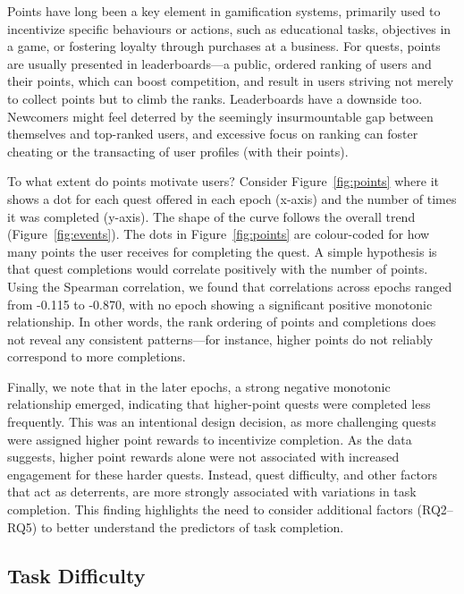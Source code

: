 Points have long been a key element in gamification systems, primarily used to incentivize specific behaviours or actions, such as educational tasks, objectives in a game, or fostering loyalty through purchases at a business. For quests, points are usually presented in leaderboards---a public, ordered ranking of users and their points, which can boost competition, and result in users striving not merely to collect points but to climb the ranks. Leaderboards have a downside too. Newcomers might feel deterred by the seemingly insurmountable gap between themselves and top-ranked users, and excessive focus on ranking can foster cheating or the transacting of user profiles (with their points).

To what extent do points motivate users? Consider Figure~\ref{fig:points} where it shows a dot for each quest offered in each epoch (x-axis) and the number of times it was completed (y-axis). The shape of the curve follows the overall trend (Figure~\ref{fig:events}). The dots in Figure~\ref{fig:points} are colour-coded for how many points the user receives for completing the quest. A simple hypothesis is that quest completions would correlate positively with the number of points. Using the Spearman correlation, we found that correlations across epochs ranged from -0.115 to -0.870, with no epoch showing a significant positive monotonic relationship. In other words, the rank ordering of points and completions does not reveal any consistent patterns—for instance, higher points do not reliably correspond to more completions.

Finally, we note that in the later epochs, a strong negative monotonic relationship emerged, indicating that higher-point quests were completed less frequently. This was an intentional design decision, as more challenging quests were assigned higher point rewards to incentivize completion. As the data suggests, higher point rewards alone were not associated with increased engagement for these harder quests. Instead, quest difficulty, and other factors that act as deterrents, are more strongly associated with variations in task completion. This finding highlights the need to consider additional factors (RQ2–RQ5) to better understand the predictors of task completion.


\subsection{Task Difficulty}

